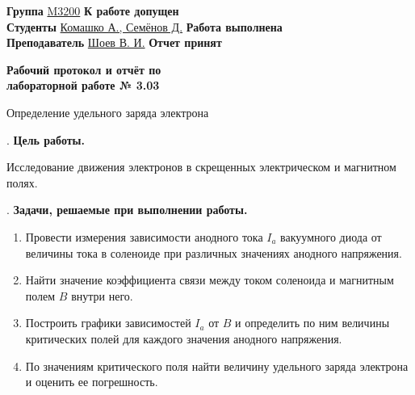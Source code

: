 \documentclass[12pt]{article}
\begin{document}
    \vspace*{2\baselineskip}

    \thispagestyle{fancy}

    \noindent
    \textbf{Группа} \underline{M3200\hspace{4.5cm}} \hfill \textbf{К работе допущен} \underline{\hspace{4cm}} \\[0.5cm]
    \textbf{Студенты} \underline{Комашко А., Семёнов Д.\hspace{0.45cm}} \hfill \textbf{Работа выполнена} \underline{\hspace{4cm}} \\[0.5cm]
    \textbf{Преподаватель} \underline{Шоев В. И.\hspace{1.9cm}} \hfill \textbf{Отчет принят} \underline{\hspace{4.85cm}} \\



    \begin{center}
    {\huge \textbf{Рабочий протокол и отчёт по\\ лабораторной работе № 3.03}}

        \smallvspace

        {\Large Определение удельного заряда электрона}
    \end{center}


    . \textbf{Цель работы.}

    Исследование движения электронов в скрещенных электрическом и магнитном полях.

    \mediumvspace

    . \textbf{Задачи, решаемые при выполнении работы.}

    \begin{enumerate} 
        \item Провести измерения зависимости анодного тока $I_a$ вакуумного
        диода от величины тока в соленоиде при различных значениях
        анодного напряжения.
        \item Найти значение коэффициента связи между током соленоида
        и магнитным полем $B$ внутри него.
        \item Построить графики зависимостей $I_a$ от $B$ и определить по
        ним величины критических полей для каждого значения анодного
        напряжения.
        \item По значениям критического поля найти величину удельного
        заряда электрона и оценить ее погрешность.
    \end{enumerate}
\end{document}
